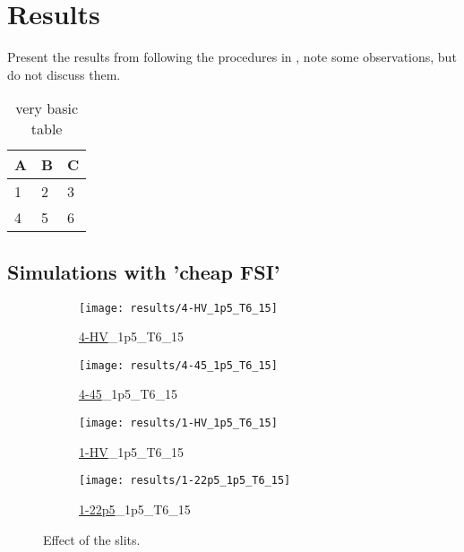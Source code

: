 \chapter{Results}\label{chapter:Results}
Present the results from following the procedures in , note some observations, but do not discuss them.

\begin{table}[h]
    \centering
    \begin{tabular}{l | l | l}
    A & B & C \\
    \hline
    1 & 2 & 3 \\
    4 & 5 & 6
    \end{tabular}
    \caption{very basic table}
    \label{tab:abc}
    \end{table}

\section{Simulations with 'cheap FSI'}

\begin{figure}
    \centering
    \begin{subfigure}[b]{0.45\textwidth}
        \centering
        \texttt{[image: results/4-HV\_1p5\_T6\_15]}
        \caption{\textcolor{tab:red}{\underline{4-HV}}\_1p5\_T6\_15}
        \label{fig:4-HV_1p5_T6_15}
    \end{subfigure}
    \begin{subfigure}[b]{0.45\textwidth}
        \centering
        \texttt{[image: results/4-45\_1p5\_T6\_15]}
        \caption{\textcolor{tab:red}{\underline{4-45}}\_1p5\_T6\_15}
        \label{fig:4-45_1p5_T6_15}
    \end{subfigure}
    \begin{subfigure}[b]{0.45\textwidth}
        \centering
        \texttt{[image: results/1-HV\_1p5\_T6\_15]}
        \caption{\textcolor{tab:red}{\underline{1-HV}}\_1p5\_T6\_15}
        \label{fig:1-HV_1p5_T6_15}
    \end{subfigure}
    \begin{subfigure}[b]{0.45\textwidth}
        \centering
        \texttt{[image: results/1-22p5\_1p5\_T6\_15]}
        \caption{\textcolor{tab:red}{\underline{1-22p5}}\_1p5\_T6\_15}
        \label{fig:1-22p5_1p5_T6_15}
    \end{subfigure}
    \caption{Effect of the slits.}
    \label{fig:effect_slit}
\end{figure}

